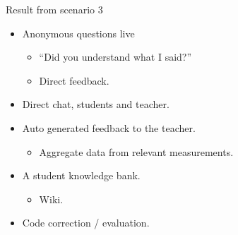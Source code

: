 Result from scenario 3
\begin{itemize}
\item Anonymous questions live
\begin{itemize}
\item ``Did you understand what I said?''
\item Direct feedback.
\end{itemize}
\item Direct chat, students and teacher.
\item Auto generated feedback to the teacher.
\begin{itemize}
\item Aggregate data from relevant measurements.
\end{itemize}
\item A student knowledge bank.
\begin{itemize}
\item Wiki.
\end{itemize}
\item Code correction / evaluation.
\end{itemize}